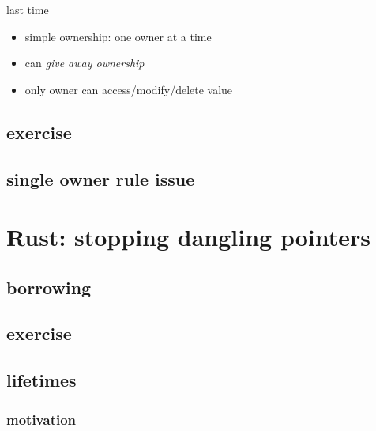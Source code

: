 \date{}
\title{}
\date{}
\usepackage[outputdir=latex.out]{minted}

\begin{frame}
    \titlepage
\end{frame}



\begin{frame}{last time}
    \begin{itemize}
    \item simple ownership: one owner at a time
    \item can \textit{give away ownership}
    \item only owner can access/modify/delete value
    \end{itemize}
\end{frame}

\subsection{exercise}


\subsection{single owner rule issue}


\section{Rust: stopping dangling pointers}


\subsection{borrowing}


\subsection{exercise}



\subsection{lifetimes}
\subsubsection{motivation}


